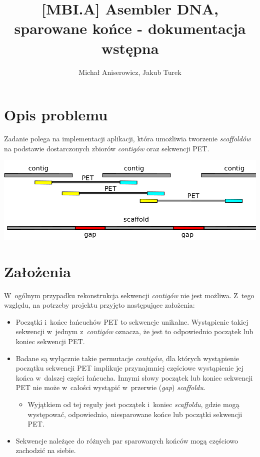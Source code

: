 \documentclass[a4paper,10pt]{article}
\title{[MBI.A] Asembler DNA, sparowane końce - dokumentacja wstępna}
\author{Michał Aniserowicz, Jakub Turek}
\date{}
\begin{document}
\maketitle

\section*{Opis problemu}

Zadanie polega na implementacji aplikacji, która umożliwia tworzenie \emph{scaffoldów} na podstawie dostarczonych zbiorów \emph{contigów} oraz sekwencji PET. 

\begin{center}
  \includegraphics[width=.9\textwidth]{contig_pet.png}
\end{center}

\section*{Założenia}

W~ogólnym przypadku rekonstrukcja sekwencji \emph{contigów} nie jest możliwa. Z~tego względu, na potrzeby projektu przyjęto następujące założenia:

\begin{itemize}
  \item Początki i~końce łańcuchów PET to sekwencje unikalne. Wystąpienie takiej sekwencji w~jednym z~\emph{contigów} oznacza, że jest to odpowiednio początek lub koniec sekwencji PET.
  \item Badane są wyłącznie takie permutacje \emph{contigów}, dla których wystąpienie początku sekwencji PET implikuje przynajmniej częściowe wystąpienie jej końca w~dalszej części łańcucha. Innymi słowy początek lub koniec sekwencji PET nie może w~całości wystąpić w~przerwie (\emph{gap}) \emph{scaffoldu}.
  
    \begin{itemize}
	  \item Wyjątkiem od tej reguły jest początek i~koniec \emph{scaffoldu}, gdzie mogą występować, odpowiednio, niesparowane końce lub początki sekwencji PET.
    \end{itemize}
  
  \item Sekwencje należące do różnych par sparowanych końców mogą częściowo zachodzić na siebie.
\end{itemize}
\end{document}
